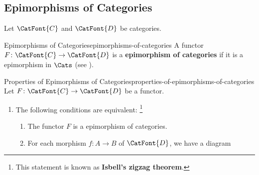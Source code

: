 \subsection{Epimorphisms of Categories}\label{subsection-epimorphisms-of-categories}
Let $\CatFont{C}$ and $\CatFont{D}$ be categories.
\begin{definition}{Epimorphisms of Categories}{epimorphisms-of-categories}%
    A functor $F\colon\CatFont{C}\to\CatFont{D}$ is a \textbf{epimorphism of categories} if it is a epimorphism in $\Cats$ (see ).%
\end{definition}
\begin{proposition}{Properties of Epimorphisms of Categories}{properties-of-epimorphisms-of-categories}%
    Let $F\colon\CatFont{C}\to\CatFont{D}$ be a functor.
    \begin{enumerate}
        \item\label{properties-of-epimorphisms-of-categories-characterisations}The following conditions are equivalent:%
            \footnote{%
                This statement is known as \textbf{Isbell's zigzag theorem}.
                \par\vspace*{-1.75\baselineskip}
            }%
            \begin{enumerate}
                \item\label{properties-of-epimorphisms-of-categories-characterisations-a}The functor $F$ is a epimorphism of categories.
                \item\label{properties-of-epimorphisms-of-categories-characterisations-b}For each morphism $f\colon A\to B$ of $\CatFont{D}$, we have a diagram
                    \begin{webcompile}
\end{webcompile}
\end{enumerate}
\end{enumerate}
\end{proposition}
